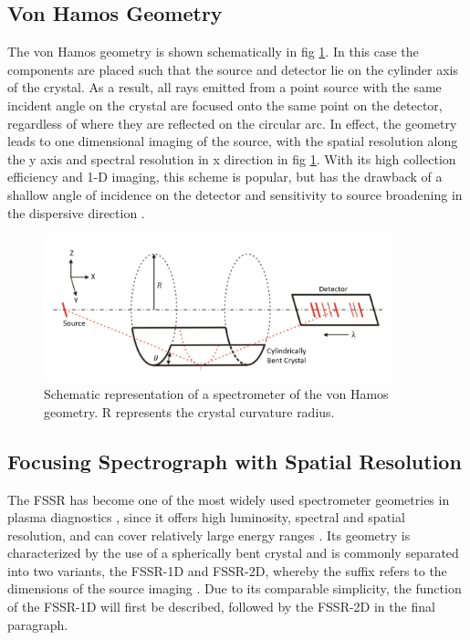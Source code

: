 \subsection{Von Hamos Geometry}

The von Hamos geometry is shown schematically in fig 
\ref{SchematicVonHamos}. 
In this case the 
components are placed such that the source and detector lie on the 
cylinder 
axis of the crystal. As a result, all rays emitted from a point 
source with the 
same incident angle on the crystal are focused onto the same point 
on the 
detector, regardless of 
where they are reflected on the circular arc. In effect, the 
geometry leads to 
one dimensional imaging of the source, with the spatial resolution 
along the y 
axis 
and spectral resolution in x direction in fig 
\ref{SchematicVonHamos}. With its 
high collection efficiency and 1-D imaging, this scheme is popular, 
but has the 
drawback of a shallow angle of incidence on the detector and 
sensitivity to 
source broadening in the dispersive direction 
\citep{renner2019challenges}.

\begin{figure}[H]
	\centering
	\includegraphics[width = 
	0.90\textwidth]{Diagrams/Schematic_vonHamos.PNG}
	\caption{Schematic representation of a spectrometer of the von 
	Hamos 
	geometry. R represents the crystal curvature radius. 
	\citep{renner2019challenges}}
	\label{SchematicVonHamos}
\end{figure}



\subsection{Focusing Spectrograph with Spatial Resolution} 
\label{SectionTheoryFSSR}

The FSSR has become 
one of the most widely used spectrometer geometries in plasma diagnostics 
\citep{yang2011focusing}, since it offers high luminosity, spectral and spatial 
resolution, and can cover relatively large energy ranges \citep{renner2019challenges}. Its geometry is 
characterized by the 
use of a spherically bent crystal and is commonly separated into two variants, 
the FSSR-1D and 
FSSR-2D, whereby the suffix refers to the dimensions of the source imaging 
\citep{renner2019challenges, blasco2001portable}. Due to its comparable 
simplicity, the function 
of the FSSR-1D will first be described, followed by the FSSR-2D in the final 
paragraph.

